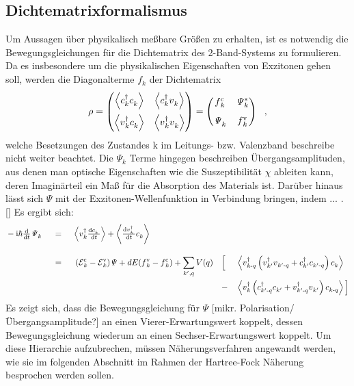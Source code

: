 \documentclass[a4paper,11pt]{article}
\newcommand{\ind}[2]{{_{#1}^{#2}}}
\newcommand{\+}{\dagger}
\newcommand{\E}{\mathcal{E}}
\newcommand{\dt}[1]{\tfrac{\tt d #1}{\tt d t}}
\newcommand{\bra}{\left \langle}
\newcommand{\ket}{\right \rangle}
\renewcommand{\^}{\hat}
\renewcommand{\tt}{\text}
\renewcommand{\~}{\widetilde}
\begin{document}
\subsection{Dichtematrixformalismus}
Um Aussagen über physikalisch meßbare Größen zu erhalten, ist es notwendig die Bewegungsgleichungen für die Dichtematrix des 2-Band-Systems zu formulieren. Da es insbesondere um die physikalischen Eigenschaften von Exzitonen gehen soll, werden die Diagonalterme $f\ind{k}{}$  der Dichtematrix
\begin{align*}
\rho 
= \begin{pmatrix}
\bra c\ind{k}{\+}c\ind{k}{} \ket & \bra c\ind{k}{\+}v\ind{k}{} \ket \\[8pt]
\bra v\ind{k}{\+}c\ind{k}{} \ket & \bra v\ind{k}{\+}v\ind{k}{}  \ket
\end{pmatrix}
=\begin{pmatrix}
f\ind{k}{\tt c}& \mathit{\Psi}\ind{k}{*}  \\[8pt]
\mathit{\Psi}\ind{k}{} & f\ind{k}{\tt v}
\end{pmatrix}\ \ ,
\end{align*}
welche Besetzungen des Zustandes k im Leitungs- bzw. Valenzband beschreibe nicht weiter beachtet. Die $\mathit{\Psi}_k$ Terme hingegen beschreiben Übergangsamplituden, aus denen man optische Eigenschaften wie die Suszeptibilität $\chi$ ableiten kann, deren Imaginärteil ein Maß für die Absorption des Materials ist. Darüber hinaus lässt sich $\mathit{\Psi}$ mit der Exzitonen-Wellenfunktion in Verbindung bringen, indem ... . []
Es ergibt sich: 
\begin{alignat*}{5}
& -\tt i\hbar \dt{}\mathit{\Psi}\ind{k}{}  && \ = \ &&  \bra  v\ind{k}{\+}\dt{c\ind{k}{}\,} \ket + \bra \dt{v\ind{k}{\+}\,}c\ind{k}{} \ket &&  &&\\[8pt]
& && \ = \ &&\ (\E \ind{k}{\tt c}-\E \ind{k}{\tt v})\mathit{\Psi}+dE(f\ind{k}{\tt v}-f\ind{k}{\tt c}) 
+ \sum_{k',q}^{} V(q)  &&\Big [ &&\bra  v\ind{k\tt -q}{\+}\left (v\ind{k'}{\+}v\ind{k'\tt -q}{}+c\ind{k'}{\+}c\ind{k'\tt-q}{}\right )c\ind{k}{} 		\ket  \\  
& && && 			   			 &&	-	   &&\bra  v\ind{k}{\+}\left (c\ind{k'\tt -q}{\+}c\ind{k'}{}+v\ind{k'\tt-q}{\+}v\ind{k'}{}\right )c\ind{k\tt -q}{}		\ket  \Big ] 	
\end{alignat*}
Es zeigt sich, dass die Bewegungsgleichung für $\mathit{\Psi}$ [mikr. Polarisation/ Übergangsamplitude?] an einen Vierer-Erwartungswert koppelt, dessen Bewegungsgleichung wiederum an einen Sechser-Erwartungswert koppelt.  Um diese Hierarchie aufzubrechen, müssen Näherungsverfahren angewandt werden, wie sie im folgenden Abschnitt im Rahmen der Hartree-Fock Näherung besprochen werden sollen. 
\end{document}

